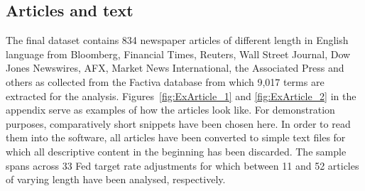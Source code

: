 \subsection{Articles and text}
The final dataset contains 834 newspaper articles of different length in English language from Bloomberg, Financial Times, Reuters, Wall Street Journal, Dow Jones Newswires, AFX, Market News International, the Associated Press and others as collected from the Factiva database from which 9,017 terms are extracted for the analysis. Figures~\ref{fig:ExArticle_1} and \vref{fig:ExArticle_2} in the appendix serve as examples of how the articles look like. For demonstration purposes, comparatively short snippets have been chosen here. In order to read them into the software, all articles have been converted to simple text files for which all descriptive content in the beginning has been discarded. The sample spans across 33 Fed target rate adjustments for which between 11 and 52 articles of varying length have been analysed, respectively.
%
